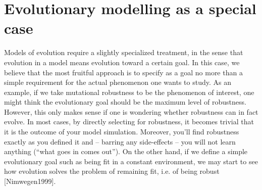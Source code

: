 \section{Evolutionary modelling as a special case}

Models of evolution require a slightly specialized treatment, in the sense that evolution in a model means evolution toward a certain goal. In this case, we believe that the most fruitful approach is to specify as a goal no more than a simple requirement for the actual phenomenon one wants to study. As an example, if we take mutational robustness to be the phenomenon of interest, one might think the evolutionary goal should be the maximum level of robustness. However, this only makes sense if one is wondering whether robustness can in fact evolve. In most cases, by directly selecting for robustness, it becomes trivial that it is the outcome of your model simulation. Moreover, you’ll find robustness exactly as you defined it and -- barring any side-effects -- you will not learn anything (``what goes in comes out''). On the other hand, if we define a simple evolutionary goal such as being fit in a constant environment, we may start to see how evolution solves the problem of remaining fit, i.e. of being robust [Nimwegen1999].
  
